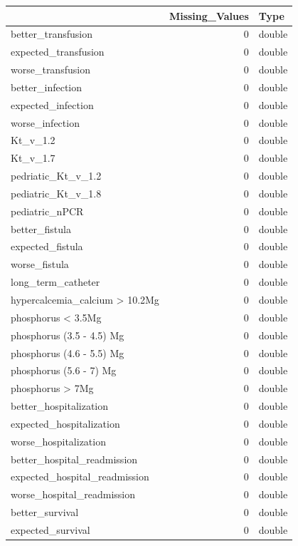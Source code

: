 \documentclass[
  letterpaper,
  DIV=11,
  numbers=noendperiod]{scrreprt}
\begin{document}
\begin{table}
\centering
\begin{tabular}[t]{l|r|l}
\hline
  & Missing\_Values & Type\\
\hline
better\_transfusion & 0 & double\\
\hline
expected\_transfusion & 0 & double\\
\hline
worse\_transfusion & 0 & double\\
\hline
better\_infection & 0 & double\\
\hline
expected\_infection & 0 & double\\
\hline
worse\_infection & 0 & double\\
\hline
Kt\_v\_1.2 & 0 & double\\
\hline
Kt\_v\_1.7 & 0 & double\\
\hline
pedriatic\_Kt\_v\_1.2 & 0 & double\\
\hline
pediatric\_Kt\_v\_1.8 & 0 & double\\
\hline
pediatric\_nPCR & 0 & double\\
\hline
better\_fistula & 0 & double\\
\hline
expected\_fistula & 0 & double\\
\hline
worse\_fistula & 0 & double\\
\hline
long\_term\_catheter & 0 & double\\
\hline
hypercalcemia\_calcium > 10.2Mg & 0 & double\\
\hline
phosphorus < 3.5Mg & 0 & double\\
\hline
phosphorus (3.5 - 4.5) Mg & 0 & double\\
\hline
phosphorus (4.6 - 5.5) Mg & 0 & double\\
\hline
phosphorus (5.6 - 7) Mg & 0 & double\\
\hline
phosphorus > 7Mg & 0 & double\\
\hline
better\_hospitalization & 0 & double\\
\hline
expected\_hospitalization & 0 & double\\
\hline
worse\_hospitalization & 0 & double\\
\hline
better\_hospital\_readmission & 0 & double\\
\hline
expected\_hospital\_readmission & 0 & double\\
\hline
worse\_hospital\_readmission & 0 & double\\
\hline
better\_survival & 0 & double\\
\hline
expected\_survival & 0 & double\\

\end{tabular}
\end{table}
\end{document}
